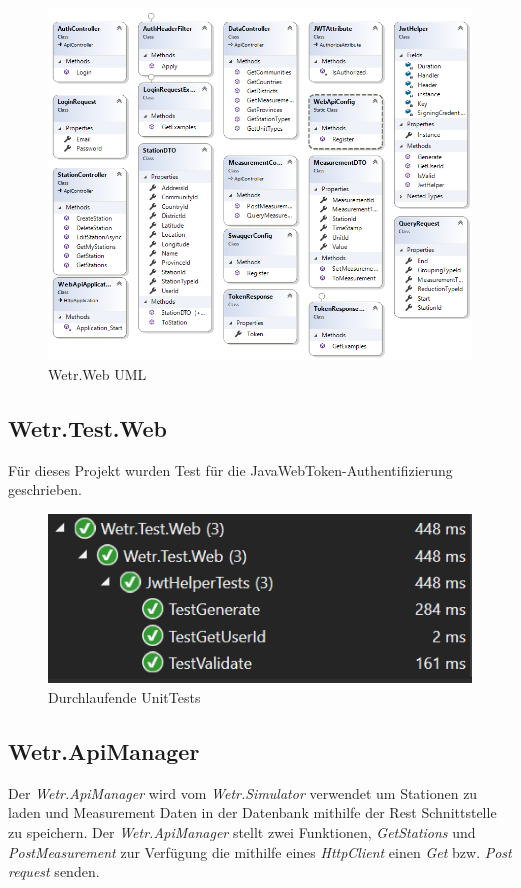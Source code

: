 \begin{figure}[H]
\centering
\includegraphics[width=\textwidth]{pictures/Wetr_Web.png}
\caption{Wetr.Web UML}
\label{fig:Wetr.Web.UML}
\end{figure}
\raggedright

\subsection{Wetr.Test.Web}
Für dieses Projekt wurden Test für die JavaWebToken-Authentifizierung geschrieben.


\begin{figure}[H]
\centering
\includegraphics[width=.5\textwidth]{pictures/webtest.PNG}
\caption{Durchlaufende UnitTests}
\end{figure}
\raggedright
\subsection{Wetr.ApiManager}
Der \textit{Wetr.ApiManager} wird vom \textit{Wetr.Simulator} verwendet um Stationen zu laden und Measurement Daten in der Datenbank mithilfe der Rest Schnittstelle zu speichern. Der \textit{Wetr.ApiManager} stellt zwei Funktionen, \textit{GetStations} und \textit{PostMeasurement} zur Verfügung die mithilfe eines \textit{HttpClient} einen \textit{Get} bzw. \textit{Post request} senden.

\newpage